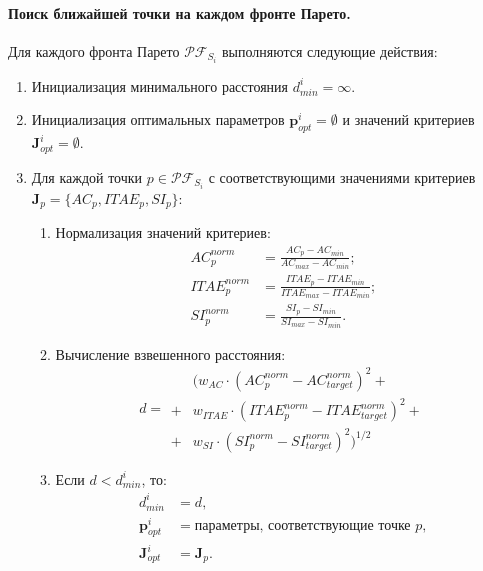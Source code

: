 \paragraph*{Поиск ближайшей точки на каждом фронте Парето.}

Для каждого фронта Парето $\mathcal{PF}_{S_i}$ выполняются следующие действия:

\begin{enumerate}
    \item Инициализация минимального расстояния $d_{min}^i = \infty$.
    \item Инициализация оптимальных параметров $\mathbf{p}_{opt}^i = \emptyset$ и значений критериев $\mathbf{J}_{opt}^i = \emptyset$.

    \item Для каждой точки $p \in \mathcal{PF}_{S_i}$ с соответствующими значениями критериев $\mathbf{J}_p = \{AC_p, ITAE_p, SI_p\}$:
          \begin{enumerate}
              \item Нормализация значений критериев:
                    \begin{equation*}
                        \begin{aligned}
                            AC_p^{norm}   & = \frac{AC_p - AC_{min}}{AC_{max} - AC_{min}}     ;    \\
                            ITAE_p^{norm} & = \frac{ITAE_p - ITAE_{min}}{ITAE_{max} - ITAE_{min}};\\
                            SI_p^{norm}   & = \frac{SI_p - SI_{min}}{SI_{max} - SI_{min}}.
                        \end{aligned}
                    \end{equation*}

\item Вычисление взвешенного расстояния:
\begin{equation*}
    d =
        \begin{aligned}
            & ( w_{AC} \cdot (AC_p^{norm} - AC_{target}^{norm})^2 +       \\
            + & w_{ITAE} \cdot (ITAE_p^{norm} - ITAE_{target}^{norm})^2 + \\
            + & w_{SI} \cdot (SI_p^{norm} - SI_{target}^{norm})^2 )^{1/2}
        \end{aligned}
\end{equation*}


              \item Если $d < d_{min}^i$, то:
                    \begin{equation*}
                        \begin{aligned}
                            d_{min}^i          & = d                                  ,         \\
                            \mathbf{p}_{opt}^i & = \text{параметры, соответствующие точке $p$}, \\
                            \mathbf{J}_{opt}^i & = \mathbf{J}_p.
                        \end{aligned}
                    \end{equation*}
          \end{enumerate}


\end{enumerate}
